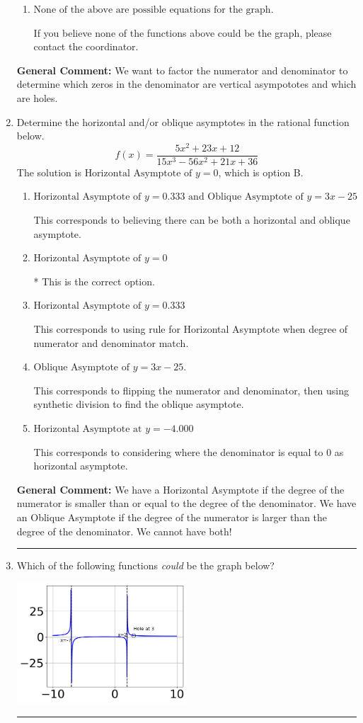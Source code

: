 \documentclass{extbook}[14pt]
\newcommand{\litem}[1]{\item #1

\rule{\textwidth}{0.4pt}}
\begin{document}
\begin{enumerate}
{\begin{enumerate}[label=\Alph*.]
You treated all of the zeros in the denominator as vertical asymptotes when some of them were holes!
\item \( \text{None of the above are possible equations for the graph.} \)

If you believe none of the functions above could be the graph, please contact the coordinator.
\end{enumerate}

\textbf{General Comment:} We want to factor the numerator and denominator to determine which zeros in the denominator are vertical asympototes and which are holes.
}
\litem{
Determine the horizontal and/or oblique asymptotes in the rational function below.
\[ f(x) = \frac{5x^{2} +23 x + 12}{15x^{3} -56 x^{2} +21 x + 36} \]The solution is \( \text{Horizontal Asymptote of } y = 0 \), which is option B.\begin{enumerate}[label=\Alph*.]
\item \( \text{Horizontal Asymptote of } y = 0.333 \text{ and Oblique Asymptote of } y = 3x -25 \)

This corresponds to believing there can be both a horizontal and oblique asymptote.
\item \( \text{Horizontal Asymptote of } y = 0 \)

* This is the correct option.
\item \( \text{Horizontal Asymptote of } y = 0.333  \)

This corresponds to using rule for Horizontal Asymptote when degree of numerator and denominator match.
\item \( \text{Oblique Asymptote of } y = 3x -25. \)

This corresponds to flipping the numerator and denominator, then using synthetic division to find the oblique asymptote.
\item \( \text{Horizontal Asymptote at } y = -4.000 \)

This corresponds to considering where the denominator is equal to 0 as horizontal asymptote.
\end{enumerate}

\textbf{General Comment:} We have a Horizontal Asymptote if the degree of the numerator is smaller than or equal to the degree of the denominator. We have an Oblique Asymptote if the degree of the numerator is larger than the degree of the denominator. We cannot have both!
}
\litem{
Which of the following functions \textit{could} be the graph below?

\begin{center}
    \includegraphics[width=0.5\textwidth]{../Figures/identifyGraphOfRationalFunctionB.png}
\end{center}


}
\end{enumerate}
\end{document}
